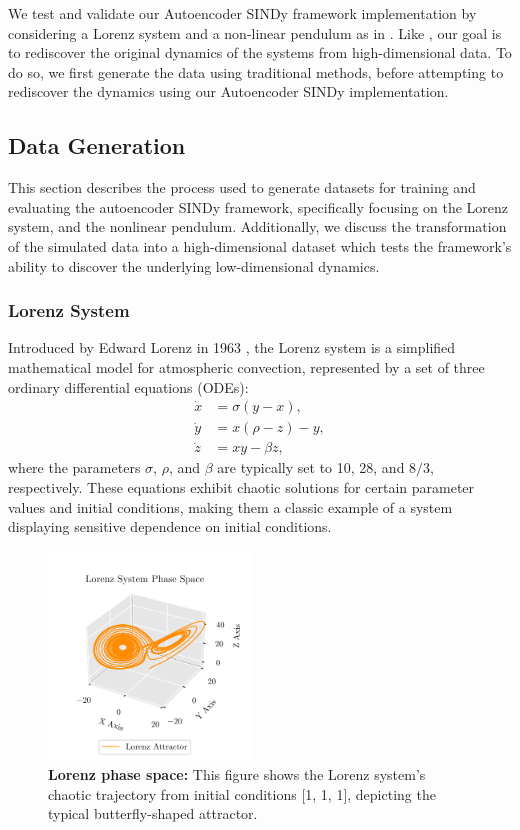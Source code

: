 We test and validate our Autoencoder SINDy framework implementation by considering a Lorenz system and a non-linear pendulum as in \textcite{Champion_2019}. Like \textcite{Champion_2019}, our goal is to rediscover the original dynamics of the systems from high-dimensional data. 
To do so, we first generate the data using traditional methods, before attempting to rediscover the dynamics using our Autoencoder SINDy implementation.


\subsection{Data Generation}
This section describes the process used to generate datasets for training and evaluating the autoencoder SINDy framework, specifically focusing on the Lorenz system, and the nonlinear pendulum. Additionally, we discuss the transformation of the simulated data into a high-dimensional dataset which tests the framework's ability to discover the underlying low-dimensional dynamics.

\subsubsection{Lorenz System}
Introduced by Edward Lorenz in 1963 \cite{lorenz1963deterministic}, the Lorenz system is a simplified mathematical model for atmospheric convection, represented by a set of three ordinary differential equations (ODEs):
\begin{equation}
\begin{aligned}
    \dot{x} &= \sigma (y - x), \\
    \dot{y} &= x (\rho - z) - y, \\
    \dot{z} &= x y - \beta z,
\end{aligned}
\label{eq:lorenz}
\end{equation}
where the parameters $\sigma$, $\rho$, and $\beta$ are typically set to 10, 28, and $8/3$, respectively. These equations exhibit chaotic solutions for certain parameter values and initial conditions, making them a classic example of a system displaying sensitive dependence on initial conditions.


\begin{figure}[!htbp]
    \centering
    \includegraphics[width=0.48\textwidth]{project_2/images/lorenz_static.pdf}
    \caption{\textbf{Lorenz phase space:} This figure shows the Lorenz system's chaotic trajectory from initial conditions [1, 1, 1], depicting the typical butterfly-shaped attractor.}
    \label{fig:lorenz}
\end{figure}

